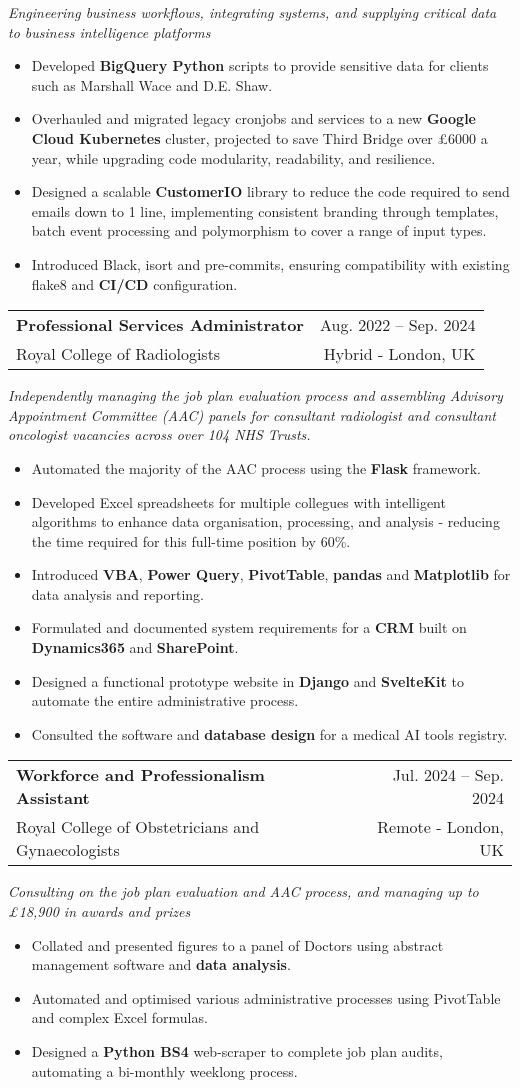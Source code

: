\documentclass[letterpaper,11pt]{article}
\makeatletter
\newcommand{\resumeItem}[1]{
  \item\small{
    {#1 \vspace{-2pt}}
  }
}
\newcommand{\resumeSubtitle}[1]{
  \vspace{5pt}
  \small{
      \textit{#1 \vspace{-7pt}}
  }
}
\newcommand{\resumeSubheading}[4]{
  \vspace{-2pt}\item
    \begin{tabular*}{0.97\textwidth}[t]{l@{\extracolsep{\fill}}r}
      \textbf{#1} & #2 \\
      {\small#3} & {\small #4} \\
    \end{tabular*}\vspace{-7pt}
}
\newcommand{\resumeItemListStart}{\begin{itemize}}
\newcommand{\resumeItemListEnd}{\end{itemize}\vspace{-5pt}}
\makeatother
\begin{document}
      \resumeSubtitle{Engineering business workflows, integrating systems, and supplying critical data to business intelligence platforms}
      \resumeItemListStart
\resumeItem{Developed \textbf{BigQuery Python} scripts to provide sensitive data for clients such as Marshall Wace and D.E. Shaw.}
\resumeItem{Overhauled and migrated legacy cronjobs and services to a new \textbf{Google Cloud Kubernetes} cluster, projected to save Third Bridge over £6000 a year, while upgrading code modularity, readability, and resilience.}
\resumeItem{Designed a scalable \textbf{CustomerIO} library to reduce the code required to send emails down to 1 line, implementing consistent branding through templates, batch event processing and polymorphism to cover a range of input types.}
\resumeItem{Introduced Black, isort and pre-commits, ensuring compatibility with existing flake8 and \textbf{CI/CD} configuration.}
      \resumeItemListEnd
  
    \resumeSubheading
      {Professional Services Administrator}{Aug. 2022 -- Sep. 2024}
      {Royal College of Radiologists}{Hybrid - London, UK}
      
      \resumeSubtitle{Independently managing the job plan evaluation process and assembling Advisory Appointment Committee (AAC) panels for consultant radiologist and consultant oncologist vacancies across over 104 NHS Trusts.}
      \resumeItemListStart
\resumeItem{Automated the majority of the AAC process using the \textbf{Flask} framework.}
\resumeItem{Developed Excel spreadsheets for multiple collegues with intelligent algorithms to enhance data organisation, processing, and analysis - reducing the time required for this full-time position by 60\%.}
\resumeItem{Introduced \textbf{VBA}, \textbf{Power Query}, \textbf{PivotTable}, \textbf{pandas} and \textbf{Matplotlib} for data analysis and reporting.}
\resumeItem{Formulated and documented system requirements for a \textbf{CRM} built on \textbf{Dynamics365} and \textbf{SharePoint}.}
\resumeItem{Designed a functional prototype website in \textbf{Django} and \textbf{SvelteKit} to automate the entire administrative process.}
\resumeItem{Consulted the software and \textbf{database design} for a medical AI tools registry.}
      \resumeItemListEnd
      

    \resumeSubheading
      {Workforce and Professionalism Assistant}{Jul. 2024 -- Sep. 2024}
      {Royal College of Obstetricians and Gynaecologists}{Remote - London, UK}
      
      \resumeSubtitle{Consulting on the job plan evaluation and AAC process, and managing up to £18,900 in awards and prizes}
      \resumeItemListStart
\resumeItem{Collated and presented figures to a panel of Doctors using abstract management software and \textbf{data analysis}.}
\resumeItem{Automated and optimised various administrative processes using PivotTable and complex Excel formulas.}
\resumeItem{Designed a \textbf{Python BS4} web-scraper to complete job plan audits, automating a bi-monthly weeklong process.}
  \resumeItemListEnd
      
\end{document}
